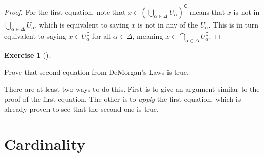 \documentclass[
  letterpaper,
  DIV=11,
  numbers=noendperiod]{scrreprt}
\newcommand{\cee}{\mathsf{C}}
\theoremstyle{plain}
\theoremstyle{definition}
\newtheorem{exercise}{Exercise}[chapter]
\theoremstyle{plain}
\theoremstyle{plain}
\theoremstyle{definition}
\theoremstyle{definition}
\theoremstyle{remark}
\begin{document}
\begin{proof}
For the first equation, note that
\(x\in\left(\bigcup_{\alpha\in\Delta} U_\alpha\right)^\cee\) means that
\(x\) is not in \(\bigcup_{\alpha\in\Delta} U_\alpha\), which is
equivalent to saying \(x\) is not in any of the \(U_\alpha\). This is in
turn equivalent to saying \(x\in U_\alpha^\cee\) for all
\(\alpha\in\Delta\), meaning
\(x\in\bigcap_{\alpha\in\Delta} U_\alpha^\cee\).
\end{proof}

\begin{exercise}[]\protect\hypertarget{exr-other-demorgan}{}\label{exr-other-demorgan}

Prove that second equation from DeMorgan's Laws is true.

\end{exercise}

\begin{tcolorbox}[enhanced jigsaw, titlerule=0mm, opacitybacktitle=0.6, leftrule=.75mm, bottomrule=.15mm, left=2mm, arc=.35mm, colback=white, rightrule=.15mm, colframe=quarto-callout-tip-color-frame, toptitle=1mm, breakable, opacityback=0, colbacktitle=quarto-callout-tip-color!10!white, bottomtitle=1mm, title=\textcolor{quarto-callout-tip-color}{\faLightbulb}\hspace{0.5em}{Hint}, coltitle=black, toprule=.15mm]

There are at least two ways to do this. First is to give an argument
similar to the proof of the first equation. The other is to \emph{apply}
the first equation, which is already proven to see that the second one
is true.

\end{tcolorbox}

\chapter{Cardinality}\label{sec-cardinality}
\end{document}
